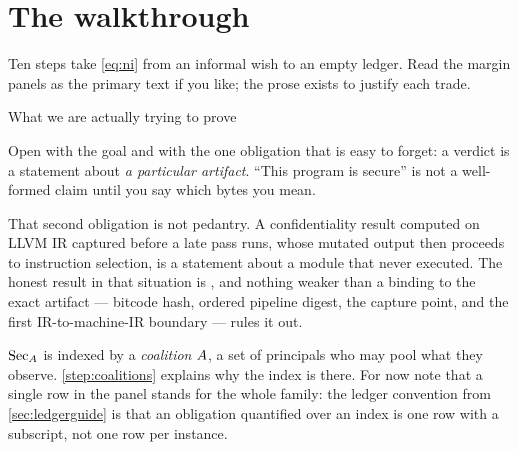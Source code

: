 \section{The walkthrough}
\label{part:walkthrough}

Ten steps take \eqref{eq:ni} from an informal wish to an empty ledger. Read the
margin panels as the primary text if you like; the prose exists to justify each
trade.

\clgreset

\begin{step}{What we are actually trying to prove}{%
}
\label{step:statement}

Open with the goal and with the one obligation that is easy to forget: a verdict
is a statement about \emph{a particular artifact}. ``This program is secure'' is
not a well-formed claim until you say which bytes you mean.

That second obligation is not pedantry. A confidentiality result computed on
LLVM IR captured before a late pass runs, whose mutated output then proceeds to
instruction selection, is a statement about a module that never executed. The
honest result in that situation is \Unknown{}, and nothing weaker than a binding
to the exact artifact --- bitcode hash, ordered pipeline digest, the capture
point, and the first IR-to-machine-IR boundary --- rules it out.

$\mathrm{Sec}_A$ is indexed by a \emph{coalition} $A$, a set of principals who
may pool what they observe. \cref{step:coalitions} explains why the index is
there. For now note that a single row in the panel stands for the whole family:
the ledger convention from \cref{sec:ledgerguide} is that an obligation
quantified over an index is one row with a subscript, not one row per instance.
\end{step}

